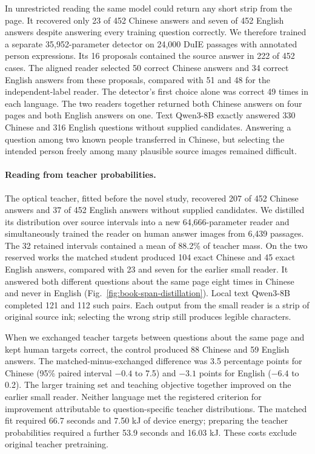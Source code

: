 \documentclass[12pt,a4paper]{article}
\providecommand{\DIFadd}[1]{{\protect\color{blue} \sf #1}} %
\begin{document}
\DIFadd{In unrestricted reading the same model could return any short strip from the page. It recovered only 23 of 452 Chinese answers and seven of 452 English answers despite answering every training question correctly. We therefore trained a separate 35,952-parameter detector on 24,000 DuIE passages with annotated person expressions. Its 16 proposals contained the source answer in 222 of 452 cases. The aligned reader selected 50 correct Chinese answers and 34 correct English answers from these proposals, compared with 51 and 48 for the independent-label reader. The detector's first choice alone was correct 49 times in each language. The two readers together returned both Chinese answers on four pages and both English answers on one. Text Qwen3-8B exactly answered 330 Chinese and 316 English questions without supplied candidates. Answering a question among two known people transferred in Chinese, but selecting the intended person freely among many plausible source images remained difficult.
}

\paragraph{\DIFadd{Reading from teacher probabilities.}}
\DIFadd{The optical teacher, fitted before the novel study, recovered 207 of 452 Chinese answers and 37 of 452 English answers without supplied candidates. We distilled its distribution over source intervals into a new 64,666-parameter reader and simultaneously trained the reader on human answer images from 6,439 passages. The 32 retained intervals contained a mean of 88.2\% of teacher mass. On the two reserved works the matched student produced 104 exact Chinese and 45 exact English answers, compared with 23 and seven for the earlier small reader. It answered both different questions about the same page eight times in Chinese and never in English (Fig.~\ref{fig:book-span-distillation}). Local text Qwen3-8B completed 121 and 112 such pairs. Each output from the small reader is a strip of original source ink; selecting the wrong strip still produces legible characters.
}

\DIFadd{When we exchanged teacher targets between questions about the same page and kept human targets correct, the control produced 88 Chinese and 59 English answers. The matched-minus-exchanged difference was 3.5 percentage points for Chinese (95\% paired interval $-0.4$ to 7.5) and $-3.1$ points for English ($-6.4$ to 0.2). The larger training set and teaching objective together improved on the earlier small reader. Neither language met the registered criterion for improvement attributable to question-specific teacher distributions. The matched fit required 66.7 seconds and 7.50 kJ of device energy; preparing the teacher probabilities required a further 53.9 seconds and 16.03 kJ. These costs exclude original teacher pretraining.
}
\end{document}
